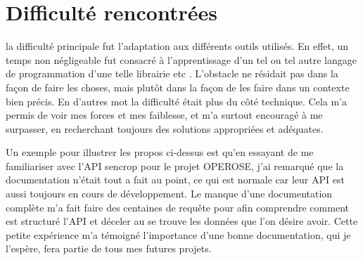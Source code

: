 \section{Difficulté rencontrées}
la difficulté principale fut l'adaptation aux différents outils utilisés. En effet, un temps non négligeable fut consacré à l'apprentissage d'un tel ou tel autre langage de programmation d'une telle librairie etc . L'obstacle ne résidait pas dans la façon de faire les choses, mais plutôt dans la façon de les faire dans un contexte bien précis. En d'autres mot la difficulté était plus du côté technique. Cela m'a permis de voir mes forces et mes faiblesse, et m'a surtout encouragé à me surpasser, en recherchant toujours des solutions appropriées et adéquates. 

Un exemple pour illustrer les propos ci-dessus est qu'en essayant de me familiariser avec l'API sencrop pour le projet OPEROSE, j'ai remarqué que la documentation n'était tout a fait au point, ce qui est normale car leur API est aussi toujours en cours de développement. Le manque d'une documentation complète m'a fait faire des centaines de requête pour afin comprendre comment est structuré l'API et déceler au se trouve les données que l'on désire avoir. Cette petite expérience m'a témoigné l'importance d'une bonne documentation, qui je l'espère, fera partie de tous mes futures projets.
